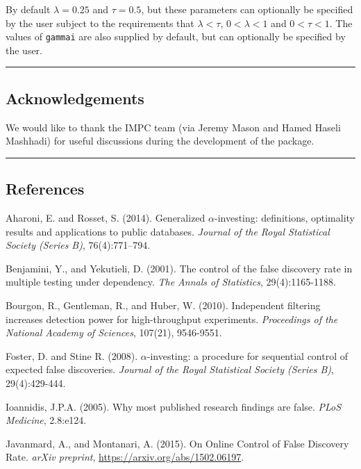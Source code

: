 \documentclass[
]{article}
\begin{document}
By default \(\lambda = 0.25\) and \(\tau = 0.5\), but these parameters
can optionally be specified by the user subject to the requirements that
\(\lambda < \tau\), \(0 < \lambda < 1\) and \(0 < \tau < 1\). The values
of \texttt{gammai} are also supplied by default, but can optionally be
specified by the user.

\begin{center}\rule{0.5\linewidth}{0.5pt}\end{center}

\hypertarget{acknowledgements}{%
\subsection{Acknowledgements}\label{acknowledgements}}

We would like to thank the IMPC team (via Jeremy Mason and Hamed Haseli
Mashhadi) for useful discussions during the development of the package.

\begin{center}\rule{0.5\linewidth}{0.5pt}\end{center}

\hypertarget{references}{%
\subsection{References}\label{references}}

Aharoni, E. and Rosset, S. (2014). Generalized \(\alpha\)-investing:
definitions, optimality results and applications to public databases.
\emph{Journal of the Royal Statistical Society (Series B)},
76(4):771--794.

Benjamini, Y., and Yekutieli, D. (2001). The control of the false
discovery rate in multiple testing under dependency. \emph{The Annals of
Statistics}, 29(4):1165-1188.

Bourgon, R., Gentleman, R., and Huber, W. (2010). Independent filtering
increases detection power for high-throughput experiments.
\emph{Proceedings of the National Academy of Sciences}, 107(21),
9546-9551.

Foster, D. and Stine R. (2008). \(\alpha\)-investing: a procedure for
sequential control of expected false discoveries. \emph{Journal of the
Royal Statistical Society (Series B)}, 29(4):429-444.

Ioannidis, J.P.A. (2005). Why most published research findings are
false. \emph{PLoS Medicine}, 2.8:e124.

Javanmard, A., and Montanari, A. (2015). On Online Control of False
Discovery Rate. \emph{arXiv preprint},
\url{https://arxiv.org/abs/1502.06197}.
\end{document}
